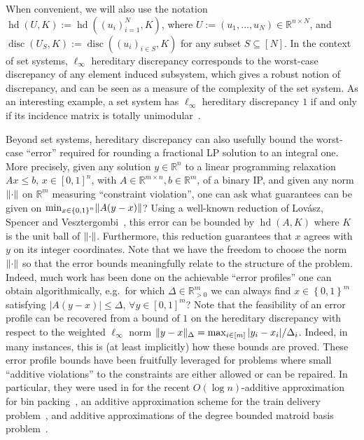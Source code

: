 \documentclass[11pt]{article}
\newcommand{\R}{{\mathbb{R}}}
\newcommand{\set}[1]{\left\{ #1 \right\}}
\DeclareMathOperator{\disc}{disc}
\DeclareMathOperator{\hd}{hd}
\DeclarePairedDelimiter\norm{\lVert}{\rVert}
\begin{document}
When convenient, we will also use the notation $\hd(U,K) :=
\hd((u_i)_{i=1}^N,K)$, where $U := (u_1,\dots,u_N) \in \R^{n \times N}$, and
$\disc(U_S,K) := \disc((u_i)_{i \in S},K)$ for any subset $S \subseteq [N]$.  In
the context of set systems, $\ell_\infty$ hereditary discrepancy corresponds to
the worst-case discrepancy of any element induced subsystem, which gives a
robust notion of discrepancy, and can be seen as a measure of the
complexity of the set system. As an interesting example,
a set system has $\ell_\infty$ hereditary discrepancy $1$ if and only if its
incidence matrix is totally unimodular~\cite{GH-tum}. 

Beyond set systems, hereditary discrepancy can also usefully bound the
worst-case ``error'' required for rounding a fractional LP solution to an
integral one. More precisely, given any solution $y \in \R^n$ to a linear
programming relaxation $Ax \leq b$, $x \in [0,1]^n$, with $A \in \R^{m \times
n}, b \in \R^m$, of a binary IP, and given any norm $\norm{\cdot}$ on $\R^m$
measuring ``constraint violation'', one can ask what guarantees can be given on
$\min_{x \in \set{0,1}^n} \norm{A(y-x)}$? Using a well-known reduction of
Lov{\'a}sz, Spencer and Vesztergombi~\cite{LSV}, this error can be bounded by
$\hd(A,K)$ where $K$ is the unit ball of $\norm{\cdot}$. Furthermore,
this reduction guarantees that $x$ agrees with $y$ on its integer coordinates.
Note that we have the freedom to choose the norm $\norm{\cdot}$ so that the
error bounds meaningfully relate to the structure of the problem. Indeed, much
work has been done on the achievable ``error profiles'' one can obtain
algorithmically, e.g.~for which $\Delta \in \R^m_{> 0}$ we can always find $x
\in \set{0,1}^m$ satisfying $|A(y-x)| \leq \Delta$, $\forall y \in [0,1]^m$?
Note that the feasibility of an error profile can be recovered from a bound of
$1$ on the hereditary discrepancy with respect to the weighted $\ell_\infty$
norm $\norm{y-x}_{\Delta} = \max_{i \in [m]} |y_i-x_i|/\Delta_i$.  Indeed, in
many instances, this is (at least implicitly) how these bounds are proved. These
error profile bounds have been fruitfully leveraged for problems where small
``additive violations'' to the constraints are either allowed or can be repaired.
In particular, they were used in for the recent $O(\log n)$-additive
approximation for bin packing~\cite{HobergRothvoss17}, an additive approximation
scheme for the train delivery problem~\cite{R12}, and additive approximations of
the degree bounded matroid basis problem~\cite{BN15}. 
\end{document}
